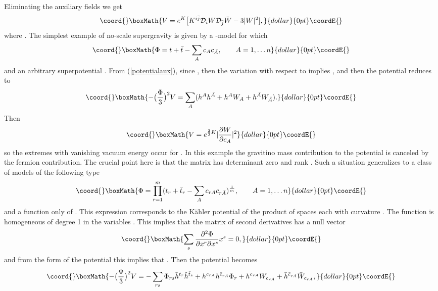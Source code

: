 \documentclass[a4paper,12pt]{article}
\begin{document}
Eliminating the auxiliary fields we get \cite{bw}
$$\coord{}\boxMath{V=e^{K}\bigl[K^{i\bar j}\mathcal{D}_iW \mathcal{D}_{\bar j}\bar
W- 3 |W|^2],}{dollar}{0pt}\coordE{}$$ where \coordHE{}.
The simplest example of no-scale supergravity is given by a
\coordHE{}  \myHighlight{$\sigma$}\coordHE{}-model \cite{ln} for which
$$\coord{}\boxMath{\Phi=t+\bar t -\sum_Ac_A c_{\bar A}, \qquad A=1,\dots n}{dollar}{0pt}\coordE{}$$ and an
arbitrary superpotential \coordHE{}. From (\ref{potentialaux}),
since \coordHE{}, then the variation with respect to \coordHE{}
implies \coordHE{}, and then the potential reduces to $$\coord{}\boxMath{-\bigl(\frac
\Phi 3 \bigr)^2V= \sum_A(h^A h^{\bar A}  +h^AW_A+  h^{\bar
A}W_{\bar A}).}{dollar}{0pt}\coordE{}$$ Then $$\coord{}\boxMath{V=e^{\frac {2}{3}K}|\frac{\partial
W}{\partial c_A}|^2}{dollar}{0pt}\coordE{}$$ so the extremes with vanishing vacuum energy
occur for \coordHE{}. In this example
 the gravitino mass contribution to the potential \coordHE{} is canceled by the \coordHE{} fermion
contribution.
 The crucial point here is that the matrix \coordHE{} has determinant zero and  rank \coordHE{}
\cite{bcf}. Such a situation generalizes to a class of models of
the following type $$\coord{}\boxMath{\Phi=\prod _{r=1}^m(t_r+\bar t_r -\sum_A
c_{rA} c_{r\bar A})^\frac 1 m, \qquad A=1,\dots n}{dollar}{0pt}\coordE{}$$ and \coordHE{} a
function only of \coordHE{}. This expression corresponds to the
K\"ahler potential of the product of \coordHE{} spaces
\coordHE{} each with curvature \coordHE{}.
The function \myHighlight{$\Phi$}\coordHE{} is homogeneous of degree 1 in the variables \coordHE{}. This implies that the matrix of second derivatives has a null vector
$$\coord{}\boxMath{\sum_s\frac{\partial^2\Phi}{\partial x^r\partial x^s}x^s=0,}{dollar}{0pt}\coordE{}$$ and from the form of the potential
this
implies that \coordHE{}. Then the potential becomes
$$\coord{}\boxMath{-\bigl(\frac \Phi 3 \bigr)^2V= -\sum_{rs}\Phi_{rs}{\tilde h}^{t_r}{\tilde h}^{\bar t_s} +h^{c_{rA}}
h^{\bar c_{r\bar A}}\Phi_r+ h^{c_{rA}}W_{c_{rA}}+\bar h^{\bar c_{r\bar A}}\bar W_{c_{rA}},}{dollar}{0pt}\coordE{}$$
\end{document}
